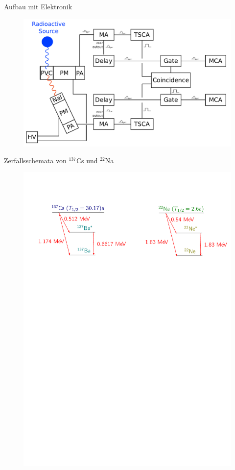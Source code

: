 \documentclass[xcolor=x11names,compress]{beamer}
\renewcommand{\(}{\begin{columns}}
\renewcommand{\)}{\end{columns}}
\newcommand{\<}[1]{\begin{column}{#1}}
\renewcommand{\>}{\end{column}}
\begin{document}
\begin{frame}[t]{Aufbau mit Elektronik}
 \begin{figure}[htpb]
    \centering
    \includegraphics[width=1.0\linewidth]{../figures/setup_pres}
\label{fig:setup_pre}
\end{figure}
\end{frame}

\begin{frame}[t]{Zerfallsschemata von $^{137}$Cs und  $^{22}$Na}
 \begin{figure}[htpb]
    \centering
    \includegraphics[width=1.0\linewidth]{../figures/terms}
\label{fig:term_schemata}
\end{figure}
\end{frame}
\end{document}
